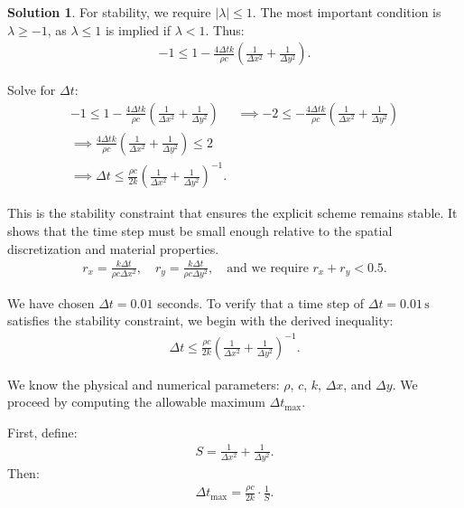 \documentclass[12pt]{article}
\theoremstyle{definition} %
\newtheorem{solution}{Solution}
\theoremstyle{plain} %
\begin{document}
\begin{solution}
\noindent For stability, we require $|\lambda| \leq 1$. The most important condition is $\lambda \geq -1$, as $\lambda \leq 1$ is implied if $\lambda < 1$. Thus:
\begin{align}
-1 \leq 1 - \frac{4\Delta t k}{\rho c}\left( \frac{1}{\Delta x^2} + \frac{1}{\Delta y^2} \right).
\end{align}

\noindent Solve for $\Delta t$:
\begin{align}
-1 \leq 1 - \frac{4\Delta t k}{\rho c}\left( \frac{1}{\Delta x^2} + \frac{1}{\Delta y^2} \right) &\implies -2 \leq - \frac{4\Delta t k}{\rho c}\left( \frac{1}{\Delta x^2} + \frac{1}{\Delta y^2}\right) \\
\implies \frac{4 \Delta t k}{\rho c}\left( \frac{1}{\Delta x^2} + \frac{1}{\Delta y^2}\right) \leq 2 \\
\implies \Delta t \leq \frac{\rho c}{2k}\left(\frac{1}{\Delta x^2} + \frac{1}{\Delta y^2}\right)^{-1}.
\end{align}

\noindent This is the stability constraint that ensures the explicit scheme remains stable. It shows that the time step must be small enough relative to the spatial discretization and material properties.
            \begin{align}
            r_x = \frac{k \Delta t}{\rho c \Delta x^2}, \quad r_y = \frac{k \Delta t}{\rho c \Delta y^2}, \quad \text{and we require } r_x + r_y < 0.5.
            \end{align}
        
            \noindent We have chosen $\Delta t = 0.01$ seconds. To verify that a time step of $\Delta t = 0.01\,\text{s}$ satisfies the stability constraint, we begin with the derived inequality:
            \begin{align}
            \Delta t \leq \frac{\rho c}{2k} \left( \frac{1}{\Delta x^2} + \frac{1}{\Delta y^2} \right)^{-1}.
            \end{align}
            
            \noindent We know the physical and numerical parameters: $\rho$, $c$, $k$, $\Delta x$, and $\Delta y$. We proceed by computing the allowable maximum $\Delta t_{\max}$.
            
            First, define:
            \begin{align}
            S = \frac{1}{\Delta x^2} + \frac{1}{\Delta y^2}.
            \end{align}
            Then:
            \begin{align}
            \Delta t_{\max} = \frac{\rho c}{2k}\cdot \frac{1}{S}.
            \end{align}
            

\end{solution}
\end{document}
